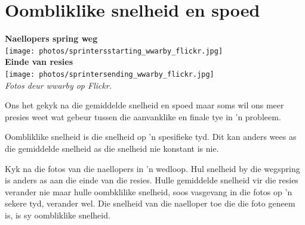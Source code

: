 \section{Oombliklike snelheid en spoed}


\begin{minipage}{.5\textwidth}
\begin{center}
\textbf{Naellopers spring weg}\\
\texttt{[image: photos/sprintersstarting\_wwarby\_flickr.jpg]}\\
\textbf{Einde van resies}\\
\texttt{[image: photos/sprintersending\_wwarby\_flickr.jpg]}\\
\textit{Fotos deur wwarby op Flickr.}
\end{center}
\end{minipage}
\begin{minipage}{.5\textwidth}

Ons het gekyk na die gemiddelde snelheid en spoed maar soms wil ons meer presies weet wat gebeur tussen die aanvanklike en finale tye in 'n probleem.

Oombliklike snelheid is die snelheid op 'n spesifieke tyd. Dit kan anders wees as die gemiddelde snelheid as die snelheid nie konstant is nie.

Kyk na die fotos van die naellopers in 'n wedloop. Hul snelheid by die wegspring is anders as aan die einde van die resies. Hulle gemiddelde snelheid vir die resies verander nie maar hulle oombklilike snelheid, soos vasgevang in die fotos op 'n sekere tyd, verander wel. Die snelheid van die naelloper toe die die foto geneem is, is sy oombliklike snelheid.

\end{minipage}

\\




